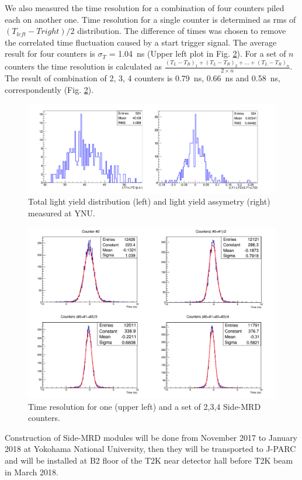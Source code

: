 We also measured the time resolution for a combination of four  counters piled each on another one.  Time resolution for a single counter is determined as rms of $(T_{left}-T{right})/2$ distribution. The difference of times was chosen to remove the correlated time fluctuation caused by a start trigger signal. The average result for four counters is  $\sigma_T$ = 1.04~ns (Upper left plot in Fig. \ref{fig:side_mrd_combi_time}). 
For a set of $n$ counters the time resolution is calculated as $\frac{(T_{L}-T_{R})_{1}+(T_{L}-T_{R})_{2}+...+(T_{L}-T_{R})_{n}}{2 \times n}$. The result of combination of 2, 3, 4 counters is 0.79~ns, 0.66~ns and 0.58~ns, correspondently (Fig. \ref{fig:side_mrd_combi_time}).  
\begin{figure}[tbh]
\begin{center}
\includegraphics[width=0.8\linewidth]{fig/side_mrd_ly.pdf}
\end{center}
\caption{
Total light yield distribution (left) and light yield assymetry (right) measured at YNU.
}
\label{fig:side_mrd_ly}
\end{figure}

\begin{figure}[tbh]
\begin{center}
\includegraphics[width=0.8\linewidth]{fig/side_mrd_combi_time.pdf}
\end{center}
\caption{
Time resolution for one (upper left) and a set of 2,3,4 Side-MRD counters.
}
\label{fig:side_mrd_combi_time}
\end{figure}
Construction of Side-MRD modules will be done from November 2017 to January 2018 at Yokohama National University, then they will be transported to J-PARC and will be installed at  B2 floor of the T2K near detector hall before  T2K beam in March 2018.